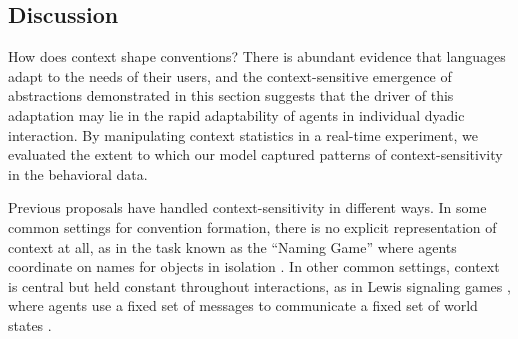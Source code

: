 

%

\subsection{Discussion}

How does context shape conventions? 
There is abundant evidence that languages adapt to the needs of their users, and the context-sensitive emergence of abstractions demonstrated in this section suggests that the driver of this adaptation may lie in the rapid adaptability of agents in individual dyadic interaction. 
By manipulating context statistics in a real-time experiment, we evaluated the extent to which our model captured patterns of context-sensitivity in the behavioral data.

Previous proposals have handled context-sensitivity in different ways.
In some common settings for convention formation, there is no explicit representation of context at all, as in the task known as the ``Naming Game'' where agents coordinate on names for objects in isolation \cite{steels2012experiments,baronchelli2008depth}. 
In other common settings, context is central but held constant throughout interactions, as in Lewis signaling games \cite{lewis_convention:_1969}, where agents use a fixed set of messages to communicate a fixed set of world states \cite{skyrms2010signals,BrunerEtAl14_LewisConventions}.

